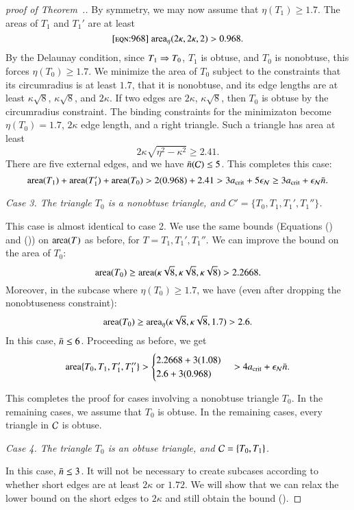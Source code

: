 \begin{proof}[proof of Theorem~.]
By symmetry, we may now assume that $\eta(T_1) \ge 1.7$.  
The areas of $T_1$ and $T_1'$ are at least
\begin{equation}\libel{eqn:968}
\areta(2\kappa,2\kappa,2) > 0.968.
\end{equation}
By the
Delaunay condition, since $T_1\Rightarrow T_0$, $T_1$ is obtuse, and $T_0$ is
nonobtuse, this forces $\eta(T_0)\ge 1.7$.  We minimize the area of
$T_0$ subject to the constraints that its circumradius is at least
$1.7$, that it is nonobtuse, and its edge lengths are at least
$\kappa\sqrt{8}$, $\kappa\sqrt{8}$, and $2\kappa$.  If two edges are
$2\kappa$, $\kappa\sqrt{8}$, then $T_0$ is obtuse by the circumradius
constraint.  The binding constraints for the minimizaton become
$\eta(T_0)=1.7$, $2\kappa$ edge length, and a right triangle.  Such a
triangle has area at least
\[
2\kappa\sqrt{\eta^2 - \kappa^2} \ge 2.41.
\]  
There are five external edges, and we have $\bar n(\mathcal C)\le 5$.
This completes this case:
\[
{\operatorname{area}}(T_1) + {\operatorname{area}}(T_1') + {\operatorname{area}}(T_0) 
>
2(0.968) + 2.41 > 3a_\text{crit} + 5 \epsilon_{\mathcal N} \ge 3a_\text{crit} + \epsilon_{\mathcal N} \bar n.
\] %

{\it Case 3. The triangle $T_0$ is a nonobtuse triangle, and
  $C'=\{T_0,T_1,T_1',T_1''\}$.}

This case is almost identical to case 2.  We use the same bounds
(Equations () and ()) on ${\operatorname{area}}(T)$ as
before, for $T = T_1, T_1', T_1''$.  We can improve the bound on the
area of $T_0$:
\[
{\operatorname{area}}(T_0) 
\ge {\operatorname{area}}(\kappa\sqrt{8},\kappa\sqrt{8},\kappa\sqrt{8}) > 2.2668.
\]
Moreover, in the subcase where $\eta(T_0)\ge 1.7$, we have
(even after dropping the nonobtuseness constraint):
\[
{\operatorname{area}}(T_0) \ge {\operatorname{area}}_\eta(\kappa\sqrt{8},\kappa\sqrt{8},1.7) > 2.6.
\]
In this case, $\bar n\le 6$.  Proceeding as before, we get
\[
{\operatorname{area}}\{T_0,T_1,T_1',T_1''\} > 
\begin{cases}
2.2668 + 3 (1.08) \\
2.6 + 3(0.968)
\end{cases}
> 4a_\text{crit} +  \epsilon_{\mathcal N} \bar n.
\] %


This completes the proof for cases involving a nonobtuse triangle
$T_0$.  In the remaining cases, we assume that $T_0$ is obtuse.  
In the remaining cases, every triangle in $\mathcal C$ is obtuse.

{\it Case 4. The triangle $T_0$ is an obtuse triangle, and $\mathcal C=\{T_0,T_1\}$.}  

In this case, $\bar n\le 3$.  It will not be necessary to create subcases
according to whether short edges are at least $2\kappa$ or $1.72$.  We
will show that we can relax the lower bound on the short edges to
$2\kappa$ and still obtain the bound ().


\end{proof}
